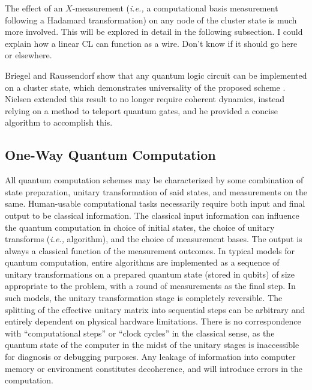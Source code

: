 \documentclass[twocolumn]{Styles/IEEEtran11}
\newcommand{\ie}{{\it i.e., }}
\newcommand{\clb}{\color{blue}}
\newcommand{\clr}{\color{myRed}}
\newcommand{\clbl}{\color{black}}
\begin{document}
\clb The effect of an $X$-measurement (\ie a computational basis measurement following a Hadamard transformation) on any node of the cluster state is much more involved. This will be explored in detail in the following subsection. \clr I could explain how a linear CL can function as a wire. Don't know if it should go here or elsewhere.

\clbl Briegel and Raussendorf show that any quantum logic circuit can be implemented on a cluster state, which demonstrates universality of the proposed scheme \cite{briegel2000measurements}. Nielsen \cite{nielsen108020universal} extended this result to no longer require coherent dynamics, instead relying on a method to teleport quantum gates, and he provided a concise algorithm to accomplish this. 

\subsection{One-Way Quantum Computation}
All quantum computation schemes may be characterized by some combination of state preparation, unitary transformation of said states, and measurements on the same. Human-usable computational tasks necessarily require both input and final output to be classical information. The classical input information can influence the quantum computation in choice of initial states, the choice of unitary transforms (\ie algorithm), and the choice of measurement bases. The output is always a classical function of the measurement outcomes. In typical models for quantum computation, entire algorithms are implemented as a sequence of unitary transformations on a prepared quantum state (stored in qubits) of size appropriate to the problem, with a round of measurements as the final step. In such models, the unitary transformation stage is completely reversible. The splitting of the effective unitary matrix into sequential steps can be arbitrary and entirely dependent on physical hardware limitations. There is no correspondence with ``computational steps'' or ``clock cycles'' in the classical sense, as the quantum state of the computer in the midst of the unitary stages is inaccessible for diagnosis or debugging purposes. Any leakage of information into computer memory or environment constitutes decoherence, and will introduce errors in the computation.
\end{document}
